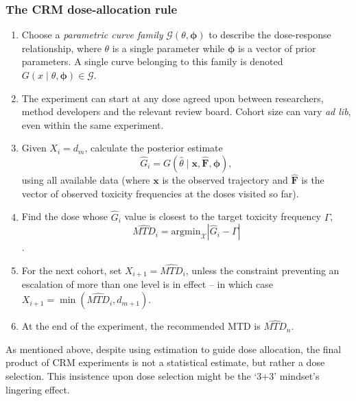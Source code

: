 \subsubsection{The CRM dose-allocation rule \citep{O'Qu:Pepe:Fish:cont:1990}}
\begin{enumerate}
\item Choose a \emph{parametric curve family} $\mathcal{G}\left(\theta,\boldsymbol{\phi}\right)$ to describe the dose-response relationship, where $\theta$ is a single parameter while $\boldsymbol{\phi}$ is a vector of prior parameters. A single curve belonging to this family is denoted\ $G\left(x\mid\theta,\boldsymbol{\phi}\right)\in\mathcal{G}$.
\item The experiment can start at any dose agreed upon between researchers, method developers and the relevant review board. Cohort size can vary \emph{ad lib}, even within the same experiment.
\item Given $X_i=d_m$, calculate the posterior estimate
$$\hat{G}_i=G\left(\hat{\theta}\mid \mathbf{x,\hat{F}},\boldsymbol{\phi}\right),$$
using all available data (where  $\mathbf{x}$ is the observed trajectory and $\mathbf{\hat{F}}$ is the vector of observed toxicity frequencies at the doses visited so far).
\item Find the dose whose $\hat{G}_i$ value is closest to the target toxicity frequency $\Gamma$, $$\widehat{MTD}_i=\mathrm{arg min}_{\mathcal{X}}\left|\hat{G}_i-\Gamma\right|$$.
\item For the next cohort, set $X_{i+1}=\widehat{MTD}_i$, unless the \cite{Good:Zahu:Pian:some:1995} constraint preventing an escalation of more than one level is in effect -- in which case $X_{i+1}=\min\left(\widehat{MTD}_i,d_{m+1}\right)$.
\item At the end of the experiment, the recommended MTD is $\widehat{MTD}_n$.
\end{enumerate}

\noindent As mentioned above, despite using estimation to guide dose allocation, the final product of CRM experiments is not a statistical estimate, but rather a dose selection. This insistence upon dose selection might be the `3+3' mindset's lingering effect.

